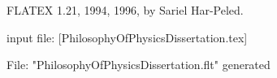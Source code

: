 FLATEX  1.21, 1994, 1996, by Sariel Har-Peled.

input file: [PhilosophyOfPhysicsDissertation.tex]

	File: "PhilosophyOfPhysicsDissertation.flt" generated
